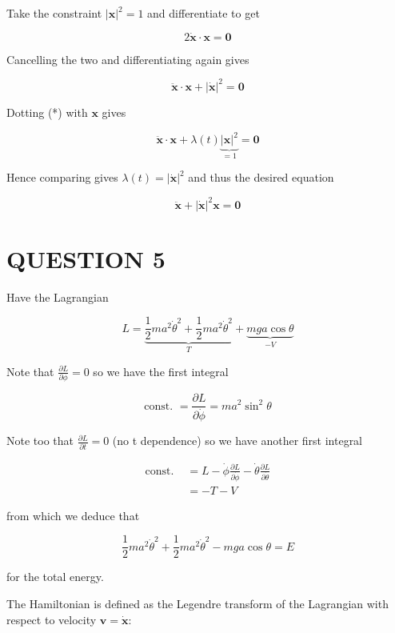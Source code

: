 \documentclass[a4paper]{article}
\begin{document}
Take the constraint $ | \mathbf{x} |^{2} = 1 $ and differentiate to get

\[ 2 \dot{\mathbf{x}} \cdot \mathbf{x} = \mathbf{0} \]

Cancelling the two and differentiating again gives

\[ \ddot{\mathbf{x}}  \cdot \mathbf{x} + | \mathbf{\dot{x}} |^{2} = \mathbf{0} \]

Dotting (*) with $ \mathbf{x} $ gives

\[  \ddot{\mathbf{x}}  \cdot \mathbf{x} + \lambda(t) \underbrace{ | \mathbf{x} |^{2}}_{=1} = \mathbf{0} \]

Hence comparing gives $ \lambda(t) =  | \mathbf{\dot{x}} |^{2} $ and thus the desired equation

\[ \ddot{\mathbf{x}} +  | \mathbf{\dot{x}} |^{2} \mathbf{x}  = \mathbf{0}\]
   

 
 
                




\section{QUESTION 5}


Have the Lagrangian

\[ L = \underbrace{\frac{1}{2} m a^{2} \dot{\theta}^{2}  + \frac{1}{2} m a^{2} \dot{\theta}^{2}  }_{T} + \underbrace{mga \cos \theta}_{- V} \]

Note that $ \frac{\partial L}{\partial \phi} = 0 $ so we have the first integral

\[ \text{const. } = \frac{\partial L }{\partial \dot{\phi}} = m a^{2} \sin^{2} \theta  \]

Note too that $ \frac{\partial L }{\partial t} = 0 $ (no t dependence) so we have another first integral

\begin{align*}
\text{const. } & = L - \dot{\phi} \frac{\partial L }{\partial \dot{\phi}} - \dot{\theta} \frac{\partial L }{\partial \dot{\theta}} \\
& = - T - V
\end{align*}

from which we deduce that

\[ \frac{1}{2} m a^{2} \dot{\theta}^{2}  + \frac{1}{2} m a^{2} \dot{\theta}^{2}  - mga \cos \theta = E \]

for the total energy.

The Hamiltonian is defined as the Legendre transform of the Lagrangian with respect to velocity $ \mathbf{v} = \dot{\mathbf{x}} $:
\end{document}
